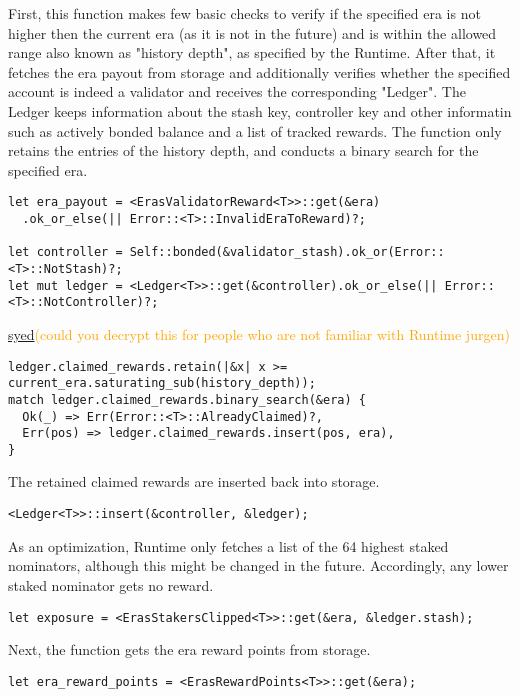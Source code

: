 \documentclass[11pt,a4paper]{article}
\newcommand{\syed}[2]{{\underline{#1}}\textcolor{orange}{(#2)}}
\begin{document}
First, this function makes few basic checks to verify if the specified era is
not higher then the current era (as it is not in the future) and is within the
allowed range also known as "history depth", as specified by the Runtime. After
that, it fetches the era payout from storage and additionally verifies whether
the specified account is indeed a validator and receives the corresponding
"Ledger". The Ledger keeps information about the stash key, controller key and
other informatin such as actively bonded balance and a list of tracked rewards.
The function only retains the entries of the history depth, and conducts a
binary search for the specified era.

\begin{verbatim}
let era_payout = <ErasValidatorReward<T>>::get(&era)
  .ok_or_else(|| Error::<T>::InvalidEraToReward)?;

let controller = Self::bonded(&validator_stash).ok_or(Error::<T>::NotStash)?;
let mut ledger = <Ledger<T>>::get(&controller).ok_or_else(|| Error::<T>::NotController)?;
\end{verbatim}


\syed{syed}{could you decrypt this for people who are not familiar with Runtime jurgen}

\begin{verbatim}
ledger.claimed_rewards.retain(|&x| x >= current_era.saturating_sub(history_depth));
match ledger.claimed_rewards.binary_search(&era) {
  Ok(_) => Err(Error::<T>::AlreadyClaimed)?,
  Err(pos) => ledger.claimed_rewards.insert(pos, era),
}
\end{verbatim}

The retained claimed rewards are inserted back into storage.

\begin{verbatim}
<Ledger<T>>::insert(&controller, &ledger);
\end{verbatim}

As an optimization, Runtime only fetches a list of the 64 highest staked
nominators, although this might be changed in the future. Accordingly, any lower
staked nominator gets no reward. 

\begin{verbatim}
let exposure = <ErasStakersClipped<T>>::get(&era, &ledger.stash);
\end{verbatim}

Next, the function gets the era reward points from storage.

\begin{verbatim}
let era_reward_points = <ErasRewardPoints<T>>::get(&era);
\end{verbatim}
\end{document}

